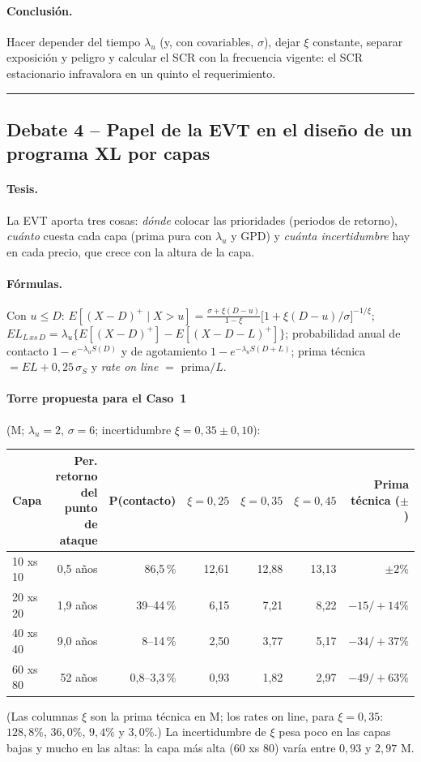 \documentclass[a4paper,12pt]{article}
\newcommand{\euro}{\texteuro}
\begin{document}
\paragraph{Conclusi\'on.} Hacer depender del tiempo $\lambda_u$ (y, con covariables, $\sigma$), dejar $\xi$ constante, separar exposici\'on y peligro y calcular el SCR con la frecuencia vigente: el SCR estacionario infravalora en un quinto el requerimiento.

\bigskip\hrule\bigskip

\subsection{Debate 4 -- Papel de la EVT en el dise\~no de un programa XL por capas}

\paragraph{Tesis.} La EVT aporta tres cosas: \emph{d\'onde} colocar las prioridades (periodos de retorno), \emph{cu\'anto} cuesta cada capa (prima pura con $\lambda_u$ y GPD) y \emph{cu\'anta incertidumbre} hay en cada precio, que crece con la altura de la capa.

\paragraph{F\'ormulas.} Con $u\le D$: $E[(X-D)^+\mid X>u]=\frac{\sigma+\xi(D-u)}{1-\xi}\big[1+\xi(D-u)/\sigma\big]^{-1/\xi}$; $EL_{L\,xs\,D}=\lambda_u\{E[(X-D)^+]-E[(X-D-L)^+]\}$; probabilidad anual de contacto $1-e^{-\lambda_uS(D)}$ y de agotamiento $1-e^{-\lambda_uS(D+L)}$; prima t\'ecnica $=EL+0{,}25\,\sigma_S$ y \emph{rate on line} $=$ prima$/L$.

\paragraph{Torre propuesta para el Caso~1} (M\euro; $\lambda_u=2$, $\sigma=6$; incertidumbre $\xi=0{,}35\pm0{,}10$):
\begin{center}
\small
\begin{tabular}{lrrrrrr}
\toprule
Capa & Per. retorno del punto de ataque & P(contacto) & $\xi=0{,}25$ & $\xi=0{,}35$ & $\xi=0{,}45$ & Prima t\'ecnica ($\pm$)\\
\midrule
10 xs 10 & 0,5 a\~nos & 86,5\,\% & 12,61 & 12,88 & 13,13 & $\pm2\%$\\
20 xs 20 & 1,9 a\~nos & 39--44\,\% & 6,15 & 7,21 & 8,22 & $-15/+14\%$\\
40 xs 40 & 9,0 a\~nos & 8--14\,\% & 2,50 & 3,77 & 5,17 & $-34/+37\%$\\
60 xs 80 & 52 a\~nos & 0,8--3,3\,\% & 0,93 & 1,82 & 2,97 & $-49/+63\%$\\
\bottomrule
\end{tabular}
\end{center}
(Las columnas $\xi$ son la prima t\'ecnica en M\euro; los rates on line, para $\xi=0{,}35$: $128{,}8\%$, $36{,}0\%$, $9{,}4\%$ y $3{,}0\%$.) La incertidumbre de $\xi$ pesa poco en las capas bajas y mucho en las altas: la capa m\'as alta (60 xs 80) var\'ia entre $0{,}93$ y $2{,}97$ M\euro.
\end{document}
